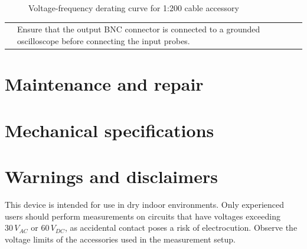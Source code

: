 \documentclass[10pt]{manual}
\begin{document}
\begin{figure}[h]
    \sffamily
    \caption{Voltage-frequency derating curve for 1:200 cable accessory}
\end{figure}

\begin{tabularx}{\textwidth}{cX}
    \raisebox{-4mm}{\warning} & Ensure that the output BNC connector is connected to a grounded oscilloscope before connecting the input probes. \\
\end{tabularx}

\section{Maintenance and repair}
\section{Mechanical specifications}
\section{Warnings and disclaimers}
This device is intended for use in dry indoor environments.
Only experienced users should perform measurements on circuits that have voltages exceeding $30\,V_{AC}$ or $60\,V_{DC}$, as accidental contact poses a risk of electrocution.
Observe the voltage limits of the accessories used in the measurement setup.
\end{document}
